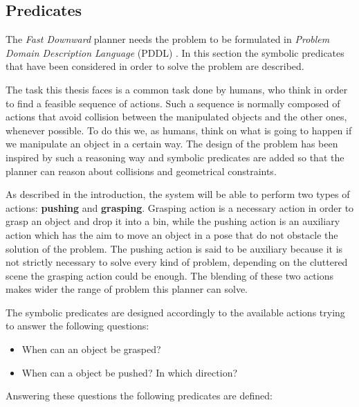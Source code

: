 \subsection{Predicates}
The \textit{Fast Downward} planner needs the problem to be formulated in \textit{Problem Domain Description Language} (PDDL) \citep{pddl}. In this section the symbolic predicates that have been considered in order to solve the problem are described.

The task this thesis faces is a common task done by humans, who think in order to find a feasible sequence of actions. Such a sequence is normally composed of actions that avoid collision between the manipulated objects and the other ones, whenever possible. To do this we, as humans, think on what is going to happen if we manipulate an object in a certain way. The design of the problem has been inspired by such a reasoning way and symbolic predicates are added so that the planner can reason about collisions and geometrical constraints.

As described in the introduction, the system will be able to perform two types of actions: \textbf{pushing} and \textbf{grasping}.
Grasping action is a necessary action in order to grasp an object and drop it into a bin, while the pushing action is an auxiliary action which has the aim to move an object in a pose that do not obstacle the solution of the problem. 
The pushing action is said to be auxiliary because it is not strictly necessary to solve every kind of problem, depending on the cluttered scene the grasping action could be enough.
The blending of these two actions makes wider the range of problem this planner can solve.    

The symbolic predicates are designed accordingly to the available actions trying to answer the following questions:
\begin{itemize}
\item When can an object be grasped? 
\item When can a object be pushed? In which direction? 
\end{itemize}
Answering these questions the following predicates are defined:


